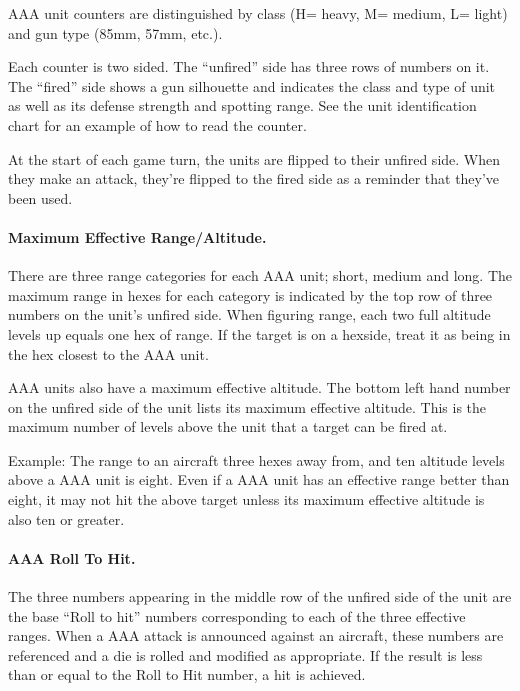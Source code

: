 

AAA unit counters are distinguished by class (H= heavy, M= medium, L= light) and gun type (85mm, 57mm, etc.).

Each counter is two sided. The “unfired” side has three rows of numbers on it. The “fired” side shows a gun silhouette and indicates the class and type of unit as well as its defense strength and spotting range. See the unit identification chart for an example of how to read the counter.

At the start of each game turn, the units are flipped to their unfired side. When they make an attack, they're flipped to the fired side as a reminder that they've been used.

\paragraph{Maximum Effective Range/Altitude.} There are three range categories for each AAA unit; short, medium and long. The maximum range in hexes for each category is indicated by the top row of three numbers on the unit's unfired side. When figuring range, each two full altitude levels up equals one hex of range. If the target is on a hexside, treat it as being in the hex closest to the AAA unit.

AAA units also have a maximum effective altitude. The bottom left hand number on the unfired side of the unit lists its maximum effective altitude. This is the maximum number of levels above the unit that a target can be fired at.

Example: The range to an aircraft three hexes away from, and ten altitude levels above a AAA unit is eight. Even if a AAA unit has an effective range better than eight, it may not hit the above target unless its maximum effective altitude is also ten or greater.

\paragraph{AAA Roll To Hit.} The three numbers appearing in the middle row of the unfired side of the unit are the base “Roll to hit” numbers corresponding to each of the three effective ranges. When a AAA attack is announced against an aircraft, these numbers are referenced and a die is rolled and modified as appropriate. If the result is less than or equal to the Roll to Hit number, a hit is achieved.

